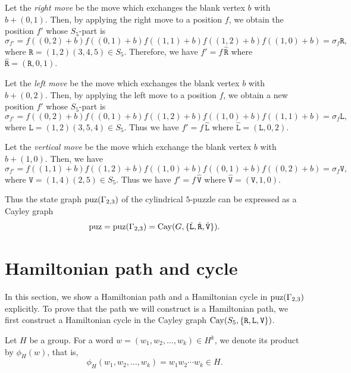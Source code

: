 \documentclass[lualatex,11pt]{article}
\begin{document}
Let the {\em right move} be the move which
exchanges the blank vertex $b$ with $b+(0,1)$.
Then, by applying  the right move to a position $f$,
we obtain the position $f'$ whose  $S_5$-part is
\[
 \sigma_{f'}=
 f((0,2)+b)f((0,1)+b)f((1,1)+b)f((1,2)+b)f((1,0)+b)
 =
 \sigma_f \mathtt{R},
\]
where ${\mathtt R}=(1,2)(3,4,5)\in S_5$.
Therefore, we have
$f'=f\,\hat{{\mathtt R}}$ where
$\hat{\mathtt R}=({\mathtt R},0,1)$.

Let the {\em left move} be the move which exchanges the blank vertex $b$ 
with $b+(0,2)$. Then, by applying the left move
to a position $f$, we obtain a new position $f'$
whose $S_5$-part is
\[
 \sigma_{f'} =
 f((0,2)+b)f((0,1)+b)f((1,2)+b)f((1,0)+b)f((1,1)+b)
 = \sigma_{f}{\mathtt L},
\]
where ${\mathtt L}=(1,2)(3,5,4)\in S_5$.
Thus we have 
$f'=f\,\hat{{\mathtt L}}$ where
$\hat{{\mathtt L}}=({\mathtt L}, 0, 2)$.

Let the {\em vertical move}
be the move which exchange the blank vertex $b$
with $b+(1,0)$.
Then, we have
\[
 \sigma_{f'} =
 f((1,1)+b)f((1,2)+b)f((1,0)+b)f((0,1)+b)f((0,2)+b)
 = \sigma_{f}{\mathtt V},
\]
where ${\mathtt V}=(1,4)(2,5)\in S_5$.
Thus we have $f'=f\,\hat{{\mathtt V}}$ where
$\hat{\mathtt V}=({\mathtt V}, 1, 0)$.

Thus the state graph ${\rm puz}(\Gamma_{2,3})$
of the cylindrical $5$-puzzle can be expressed as a Cayley graph
\[
 {\rm puz}={\rm puz}(\Gamma_{2,3})={\rm Cay}(G, \{\hat{\mathtt{\mathtt L}}, \hat{\mathtt{\mathtt R}}, \hat{\mathtt{\mathtt V}}\}).
\]

\section{Hamiltonian path and cycle}
In this section, 
we show a Hamiltonian path and a Hamiltonian cycle
in ${\rm puz}(\Gamma_{2,3})$ explicitly.
To prove that the path we will construct is a Hamiltonian path, 
we first construct a Hamiltonian cycle in
the Cayley graph ${\rm Cay}(S_5,\{{\mathtt R},{\mathtt L},{\mathtt V}\})$.

Let $H$ be a group.
For a word $w=(w_1, w_2, \ldots, w_k)\in H^{k}$,
we denote its product by $\phi_H(w)$, that is,
\[
 \phi_H(w_1,w_2,\ldots, w_k) =
 w_1 w_2 \cdots w_k \in H.
\]
\end{document}
